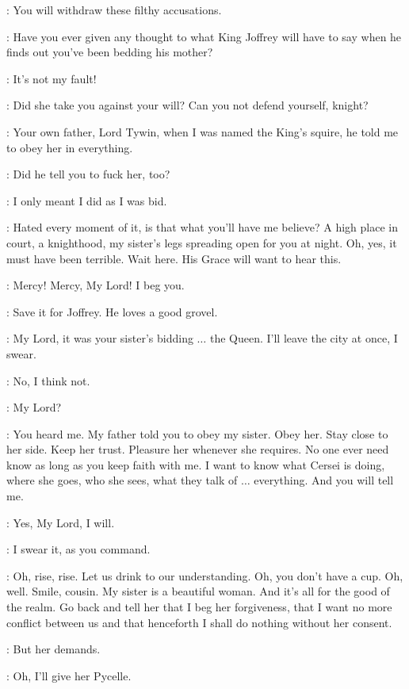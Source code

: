 \LANCEL: You will withdraw these filthy accusations. 

\TYRION: Have you ever given any thought to what King Joffrey will have to say when he finds out you've been bedding his mother? 

\LANCEL: It's not my fault! 

\TYRION: Did she take you against your will? Can you not defend yourself, knight? 

\LANCEL: Your own father, Lord Tywin, when I was named the King's squire, he told me to obey her in everything. 

\TYRION: Did he tell you to fuck her, too? 

\LANCEL: I only meant I did as I was bid. 

\TYRION: Hated every moment of it, is that what you'll have me believe? A high place in court, a knighthood, my sister's legs spreading open for you at night. Oh, yes, it must have been terrible. Wait here. His Grace will want to hear this. 

\LANCEL: Mercy! Mercy, My Lord! I beg you. 


\TYRION: Save it for Joffrey. He loves a good grovel. 

\LANCEL: My Lord, it was your sister's bidding $\ldots$ the Queen. I'll leave the city at once, I swear. 

\TYRION: No, I think not. 

\LANCEL: My Lord? 

\TYRION: You heard me. My father told you to obey my sister. Obey her. Stay close to her side. Keep her trust. Pleasure her whenever she requires. No one ever need know as long as you keep faith with me. I want to know what Cersei is doing, where she goes, who she sees, what they talk of $\ldots$ everything. And you will tell me. 

\TYRION: Yes, My Lord, I will. 

\LANCEL: I swear it, as you command. 

\TYRION: Oh, rise, rise. Let us drink to our understanding. Oh, you don't have a cup. Oh, well. Smile, cousin. My sister is a beautiful woman. And it's all for the good of the realm. Go back and tell her that I beg her forgiveness, that I want no more conflict between us and that henceforth I shall do nothing without her consent. 

\LANCEL: But her demands. 

\TYRION: Oh, I'll give her Pycelle. 

